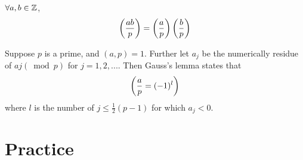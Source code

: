 \documentclass[11pt]{Numbertheory}
\begin{document}
\begin{property}
    $\forall a, b\in \mathbb{Z}$,
    \[
        \left( \frac{ab}{p} \right) = \left( \frac{a}{p}\right) \left( \frac{b}{p}\right)
    \]
\end{property}


\begin{lemma}
    Suppose $p$ is a prime, and $(a, p) = 1$. Further let $a_j$ be the numerically residue of $aj(\bmod p)$ for $j = 1, 2, ...$. Then Gauss's lemma states that 
    \[  
        \left( \frac{a}{p} = (-1)^l\right)
    \]
    where $l$ is the number of $j \le \frac{1}{2} (p-1)$ for which $a_j < 0$.
\end{lemma}
\section{Practice}
\end{document}
